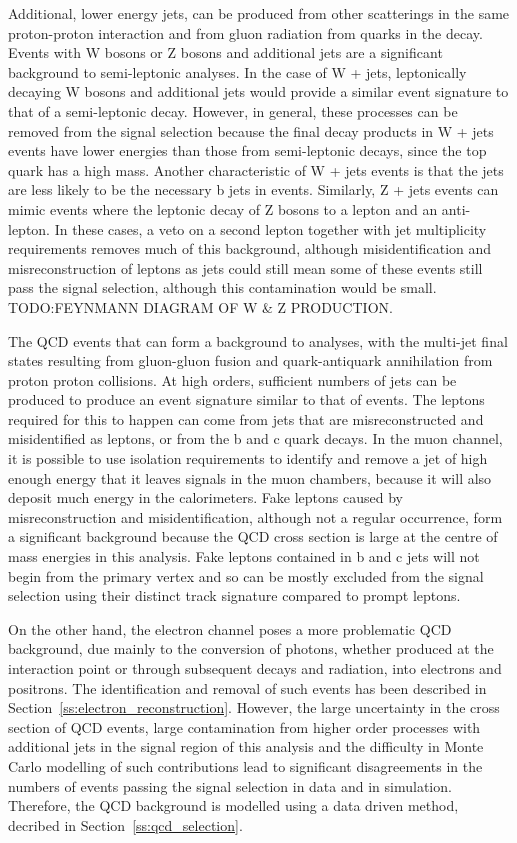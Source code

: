 Additional, lower energy jets, can be produced from other scatterings in the same proton-proton interaction
and from gluon radiation from quarks in the decay. Events with W bosons or Z bosons and additional jets are a
significant background to semi-leptonic \ttbar analyses. In the case of W + jets, leptonically decaying W
bosons and additional jets would provide a similar event signature to that of a semi-leptonic \ttbar decay.
However, in general, these processes can be removed from the signal selection because the final decay products
in W + jets events have lower energies than those from semi-leptonic \ttbar decays, since the top quark has a
high mass. Another characteristic of W + jets events is that the jets are less likely to be the necessary b
jets in \ttbar events. Similarly, Z + jets events can mimic \ttbar events where the leptonic decay of Z
bosons to a lepton and an anti-lepton. In these cases, a veto on a second lepton together with jet
multiplicity requirements removes much of this background, although misidentification and misreconstruction
of leptons as jets could still mean some of these events still pass the signal selection, although this
contamination would be small. TODO:FEYNMANN DIAGRAM OF W & Z PRODUCTION.

The QCD events that can form a background to \ttbar analyses, with the multi-jet final states resulting from
gluon-gluon fusion and quark-antiquark annihilation from proton proton collisions. At high orders, sufficient
numbers of jets can be produced to produce an event signature similar to that of \ttbar events. The leptons
required for this to happen can come from jets that are misreconstructed and misidentified as leptons, or from
the b and c quark decays. In the muon channel, it is possible to use isolation requirements to identify and
remove a jet of high enough energy that it leaves signals in the muon chambers, because it will also deposit
much energy in the calorimeters. Fake leptons caused by misreconstruction and misidentification, although not
a regular occurrence, form a significant background because the QCD cross section is large at the centre of
mass energies in this analysis. Fake leptons contained in b and c jets will not begin from the primary vertex
and so can be mostly excluded from the signal selection using their distinct track signature compared to prompt
leptons.

On the other hand, the electron channel poses a more problematic QCD background, due mainly to the conversion
of photons, whether produced at the interaction point or through subsequent decays and radiation, into
electrons and positrons. The identification and removal of such events has been described in
Section~\ref{ss:electron_reconstruction}. However, the large uncertainty in the cross section of QCD events,
large contamination from higher order processes with additional jets in the signal region of this analysis and
the difficulty in Monte Carlo modelling of such contributions lead to significant disagreements in the numbers
of events passing the signal selection in data and in simulation. Therefore, the QCD background is
modelled using a data driven method, decribed in Section~\ref{ss:qcd_selection}.

